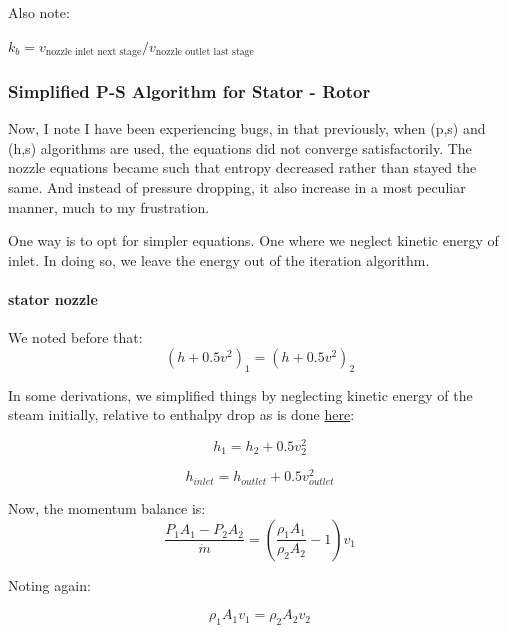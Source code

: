 \documentclass[masters]{ucbthesis}
\renewcommand{\_}{\kern-1.5pt\textunderscore\kern-1.5pt}
\begin{document}
Also note: 

$k_b = 
v_\text{nozzle inlet next stage}/
v_\text{nozzle outlet last stage}$

\subsubsection{Simplified P-S Algorithm for Stator - Rotor}

Now, I note I have been experiencing bugs, in that previously, when 
(p,s) and (h,s) algorithms are used, the equations did not converge 
satisfactorily. The nozzle equations became such that entropy  
decreased rather than stayed the same. And instead of pressure dropping,
it also increase in a most peculiar manner, much to my frustration.

One way is to opt for simpler equations. One where we neglect kinetic 
energy of inlet. In doing so, we leave the energy out of 
the iteration algorithm.

\paragraph{stator nozzle}

We noted before that:
\begin{equation*}
	\left( h + 0.5 v^2 \right)_1 = 
	\left( h + 0.5 v^2 \right)_2
\end{equation*}

In some derivations, we simplified things by neglecting kinetic 
energy of the steam initially, relative to enthalpy drop as 
is done \href{https://www.gcoeara.ac.in/learning_material/mech/UNIT_III_Steam_Turbine1.pdf}{here}:

\begin{equation*}
	h_1 = 
	h_2 + 0.5 v^2_2 
\end{equation*}

\begin{equation*}
	h_{inlet} = 
	h_{outlet} + 0.5 v^2_{outlet} 
\end{equation*}

Now, the momentum balance is:
\begin{equation*}
	\frac{P_1 A_1 - P_{2} A_2}{\dot{m}} =  \left( 
		\frac{\rho_1 A_1 }{\rho_{2}  A_2} - 1
	\right)
	v_1
\end{equation*}

Noting again:

\begin{equation*}
	\rho_1 A_1 v_1 = \rho_2 A_2 v_2
\end{equation*}
\end{document}
